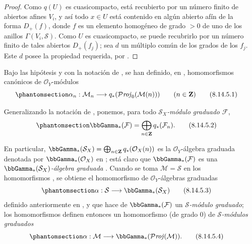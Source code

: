 \documentclass[oneside,10pt]{amsart}
\makeatletter
\newcommand{\ega@arrow}[2]{\mathchoice{#1}{#2}{#2}{#2}}
\renewcommand{\to}{\ega@arrow{\longrightarrow}{\rightarrow}}
\newcommand{\oldpage}[2][]{\marginnote{\normalfont\footnotesize\textbf{#1}~|~#2}\ignorespaces}
\let\EGAOriginalLabel\label
\renewcommand{\label}[1]{\phantomsection\EGAOriginalLabel{#1}}
\makeatother
\begin{document}
\begin{proof}
Como $q(U)$ es cuasicompacto, está recubierto por un número finito de abiertos afines $V_i$, y así todo $x\in U$ está contenido en algún abierto afín de la forma $D_+(f)$, donde $f$ es un elemento homogéneo de grado $>0$ de uno de los anillos $\Gamma(V_i,\mathcal{S})$.
Como $U$ es cuasicompacto, se puede recubrirlo por un número finito de tales abiertos $D_+(f_j)$;
sea $d$ un múltiplo común de los grados de los $f_j$.
Este $d$ posee la propiedad requerida, por .
\end{proof}

\begin{env}[8.14.5]
\label{II.8.14.5-fr}
Bajo las hipótesis y con la notación de , se han definido, en , homomorfismos canónicos de $\mathcal{O}_Y$-módulos
\begin{equation}
\label{II.8.14.5.1-fr}
  \alpha_n:\mathcal{M}_n\to
  q_*(\mathcal{P}\mathit{roj}_0(\mathcal{M}(n)))
  \qquad(n\in\mathbf{Z})
\tag{8.14.5.1}
\end{equation}

Generalizando la notación de , ponemos, para todo \emph{$\mathcal{S}_X$-módulo graduado $\mathcal{F}$},
\begin{equation}
\label{II.8.14.5.2-fr}
  \bbGamma_*(\mathcal{F})=
  \bigoplus_{n\in\mathbf{Z}}q_*(\mathcal{F}_n).
\tag{8.14.5.2}
\end{equation}

En particular, $\bbGamma_*(\mathcal{S}_X)=\bigoplus_{n\in\mathbf{Z}}q_*(\mathcal{O}_X(n))$ es la $\mathcal{O}_Y$-álgebra graduada denotada por $\bbGamma_*(\mathcal{O}_X)$ en ;
está claro que $\bbGamma_*(\mathcal{F})$ es una \emph{$\bbGamma_*(\mathcal{S}_X)$-álgebra graduada} .
Cuando
\oldpage[II]{199}
se toma $\mathcal{M}=\mathcal{S}$ en los homomorfismos , se obtiene el homomorfismo de $\mathcal{O}_Y$-álgebras graduadas
\begin{equation}
\label{II.8.14.5.3-fr}
  \alpha:\mathcal{S}\to\bbGamma_*(\mathcal{S}_X)
\tag{8.14.5.3}
\end{equation}
definido anteriormente en , y que hace de $\bbGamma_*(\mathcal{F})$ un \emph{$\mathcal{S}$-módulo graduado};
los homomorfismos  definen entonces un homomorfismo (de grado $0$) de \emph{$\mathcal{S}$-módulos graduados}
\begin{equation}
\label{II.8.14.5.4-fr}
  \alpha:\mathcal{M}\to\bbGamma_*(\mathcal{P}\mathit{roj}(\mathcal{M})).
\tag{8.14.5.4}
\end{equation}
\end{env}
\end{document}

